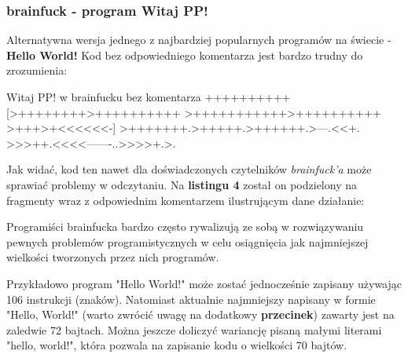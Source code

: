 \documentclass[fleqn,10pt]{SelfArx} %
\begin{document}
\subsubsection{brainfuck - program Witaj PP!}
Alternatywna wersja jednego z najbardziej popularnych programów na świecie - \textbf{Hello World!}
Kod bez odpowiedniego komentarza jest bardzo trudny do zrozumienia:
\begin{sexylisting}{Witaj PP! w brainfucku bez komentarza}
++++++++++[>++++++++>++++++++++ >+++++++++++>++++++++++ >+++>+<<<<<<-]
>+++++++.>+++++.>++++++.>---.<<+.
>>>++.<<<<-------..>>>>+.>.
\end{sexylisting}

Jak widać, kod ten nawet dla doświadczonych czytelników \textit{brainfuck'a} może sprawiać problemy w odczytaniu.
Na \textbf{listingu 4} został on podzielony na fragmenty wraz z odpowiednim komentarzem ilustrującym dane działanie:


Programiści brainfucka bardzo często rywalizują ze sobą w rozwiązywaniu pewnych problemów
programistycznych w celu osiągnięcia jak najmniejszej wielkości tworzonych przez nich programów.
\begin{adjustwidth}{1cm}{0cm} 
	Przykładowo program "Hello World!" może zostać jednocześnie zapisany używając 106 instrukcji (znaków).
	Natomiast aktualnie najmniejszy napisany w formie "Hello, World!" (warto zwrócić uwagę na dodatkowy \textbf{przecinek}) zawarty jest na zaledwie 72 bajtach.
	Można jeszcze doliczyć wariancję pisaną małymi literami "hello, world!", która pozwala na zapisanie kodu o wielkości 70 bajtów.\cite{brainfuck:shortest}
\end{adjustwidth}
\end{document}
